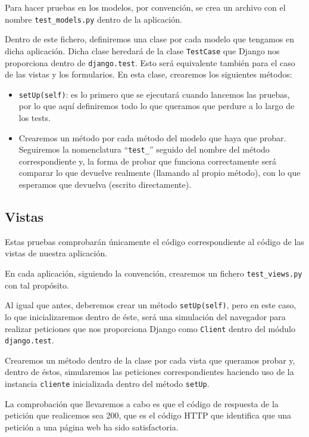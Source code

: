 Para hacer pruebas en los modelos, por convención, se crea un archivo con el nombre \texttt{test\_models.py} dentro de la aplicación.

Dentro de este fichero, definiremos una clase por cada modelo que tengamos en dicha aplicación. Dicha clase heredará de la clase \texttt{TestCase} que Django nos proporciona dentro de \texttt{django.test}. Esto será equivalente también para el caso de las vistas y los formularios. En esta clase, crearemos los siguientes métodos:

\begin{itemize}
	\item \texttt{setUp(self)}: es lo primero que se ejecutará cuando lancemos las pruebas, por lo que aquí definiremos todo lo que queramos que perdure a lo largo de los tests.
	\item Crearemos un método por cada método del modelo que haya que probar. Seguiremos la nomenclatura ``\texttt{test\_}'' seguido del nombre del método correspondiente y, la forma de probar que funciona correctamente será comparar lo que devuelve realmente (llamando al propio método), con lo que esperamos que devuelva (escrito directamente).
\end{itemize}

\subsection{Vistas}

Estas pruebas comprobarán únicamente el código correspondiente al código de las vistas de nuestra aplicación.

En cada aplicación, siguiendo la convención, crearemos un fichero \texttt{test\_views.py} con tal propósito.

Al igual que antes, deberemos crear un método \texttt{setUp(self)}, pero en este caso, lo que inicializaremos dentro de éste, será una simulación del navegador para realizar peticiones que nos proporciona Django como \texttt{Client} dentro del módulo \texttt{django.test}.

Crearemos un método dentro de la clase por cada vista que queramos probar y, dentro de éstos, simularemos las peticiones correspondientes haciendo uso de la instancia \texttt{cliente} inicializada dentro del método \texttt{setUp}.

La comprobación que llevaremos a cabo es que el código de respuesta de la petición que realicemos sea 200, que es el código HTTP que identifica que una petición a una página web ha sido satisfactoria.

